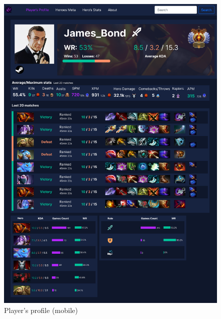     \begin{figure}[h]
        \centering
        \begin{minipage}[t]{0.48\textwidth}
            \centering
            \includegraphics[width=\textwidth]{images/PlayerProfile_m}
            \caption{Player's profile (mobile)}
        \end{minipage}
        \hfill
        \begin{minipage}[t]{0.48\textwidth}
            \centering

\end{minipage}
\end{figure}
